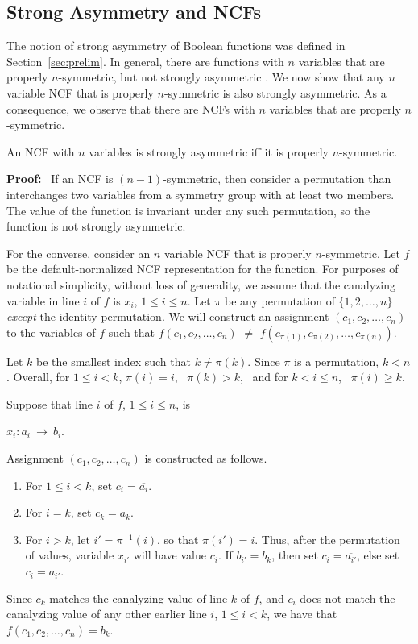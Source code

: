 \subsection{Strong Asymmetry and NCFs}
\label{sse:strong_asym_ncf}

The notion of strong asymmetry of Boolean functions was defined 
in Section~\ref{sec:prelim}.
In general, there are functions with $n$ variables that are properly
$n$-symmetric, but not strongly asymmetric \cite{KS-2000}.
We now show that any $n$ variable NCF that is properly $n$-symmetric
is also strongly asymmetric.
As a consequence, we observe that there are NCFs with $n$ variables
that are properly $n$-symmetric.

\begin{theorem}\label{thm:ncf_strong_asymmetry}
An NCF with $n$ variables is strongly asymmetric iff
it is properly $n$-symmetric.
\end{theorem}

\noindent
\textbf{Proof:}~ 
If an NCF is $(n-1)$-symmetric, then consider a permutation than
interchanges two variables from a symmetry group with at least two
members.  The value of the function is invariant under any such
permutation, so the function is not strongly asymmetric.

For the converse, consider an $n$ variable NCF that is properly $n$-symmetric.
Let $f$ be the default-normalized NCF representation for the function.  For
purposes of notational simplicity, without loss of generality,
we assume that the canalyzing
variable in line $i$ of $f$ is $x_i$, $1 \leq i \leq n$.  Let $\pi$
be any permutation of $\{1, 2, \ldots, n\}$ \emph{except} the
identity permutation.  We will construct an assignment $(c_1, c_2,
\ldots,  c_n)$ to the variables of $f$ such that $f(c_1, c_2, \ldots,
c_n)$ $\neq$ $f(c_{\pi(1)}, c_{\pi(2)}, \ldots, c_{\pi(n)})$.

Let $k$ be the smallest index such that $k \neq \pi(k)$.  Since
$\pi$ is a permutation, $k < n$.  Overall, for $1 \leq i < k$,
$\pi(i) = i$,~ $\pi(k) > k$,~ and for $k < i \leq n$,~ $\pi(i) \geq k$.

Suppose that line $i$ of $f$, $1 \leq i \leq n$, is 

\smallskip

\hspace*{1in} $x_i : a_i ~\longrightarrow~ b_i$. 

\smallskip

\noindent
Assignment $(c_1, c_2, \ldots,  c_n)$ is constructed as follows.
\begin{enumerate}
\item For $1 \leq i < k$, set $c_i = \overline{a_i}$.  
\item For $i = k$, set $c_k =a_k$. 
\item For $i > k$, let $i' = \pi^{-1}(i)$, so that $\pi(i')
= i$.  Thus, after the permutation of values, variable $x_{i'}$
will have value $c_i$.  If $b_{i'} = b_k$, then set $c_i =
\overline{a_{i'}}$, else set $c_i =  a_{i'}$.
\end{enumerate}
Since $c_k$ matches the canalyzing value of line $k$ of $f$, and
$c_i$ does not match the canalyzing value of any other earlier line
$i$, $1 \leq i < k$, we have that $f(c_1, c_2, \ldots,  c_n) = b_k$.

